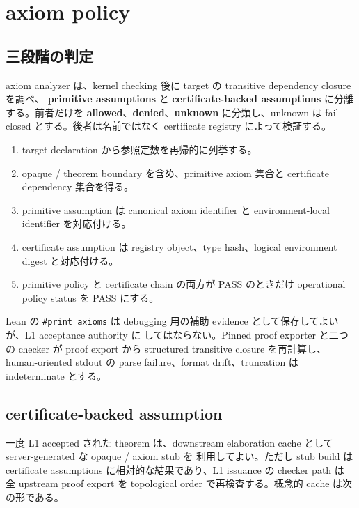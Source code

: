 \documentclass[a4paper,11pt]{ltjsarticle}
\newcommand{\term}[1]{\textbf{\color{TFNavy}#1}}
\newcommand{\code}[1]{\texttt{#1}}
\begin{document}
\section{axiom policy}

\subsection{三段階の判定}

axiom analyzer は、kernel checking 後に target の transitive dependency closure を調べ、
\term{primitive assumptions} と \term{certificate-backed assumptions} に分離する。前者だけを
\term{allowed}、\term{denied}、\term{unknown} に分類し、unknown は fail-closed とする。後者は名前ではなく
certificate registry によって検証する。

\begin{enumerate}
  \item target declaration から参照定数を再帰的に列挙する。
  \item opaque / theorem boundary を含め、primitive axiom 集合と certificate dependency 集合を得る。
  \item primitive assumption は canonical axiom identifier と environment-local identifier を対応付ける。
  \item certificate assumption は registry object、type hash、logical environment digest と対応付ける。
  \item primitive policy と certificate chain の両方が PASS のときだけ operational policy status を PASS にする。
\end{enumerate}

Lean の \code{\#print axioms} は debugging 用の補助 evidence として保存してよいが、L1 acceptance authority に
してはならない。Pinned proof exporter と二つの checker が proof export から structured transitive closure を再計算し、
human-oriented stdout の parse failure、format drift、truncation は indeterminate とする\cite{leanvalidate}。

\subsection{certificate-backed assumption}

一度 L1 accepted された theorem は、downstream elaboration cache として server-generated な opaque / axiom stub を
利用してよい。ただし stub build は certificate assumptions に相対的な結果であり、L1 issuance の checker path は
全 upstream proof export を topological order で再検査する。概念的 cache は次の形である。
\end{document}
